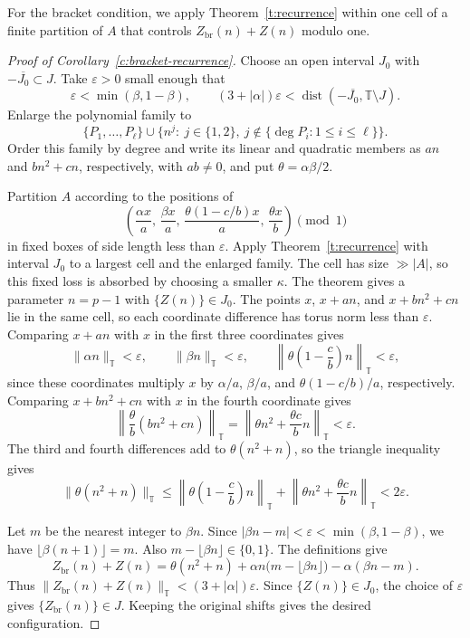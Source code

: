 \documentclass[12pt]{amsart}
\newcommand{\1}{\mathbf 1}
\theoremstyle{definition}
\begin{document}
For the bracket condition, we apply Theorem~\ref{t:recurrence}
within one cell of a finite partition of $A$ that controls
$Z_{\mathrm{br}}(n)+Z(n)$ modulo one.

\begin{proof}[Proof of Corollary~\ref{c:bracket-recurrence}]
Choose an open interval $J_0$ with $-\overline{J_0}\subset J$.
Take $\varepsilon>0$ small enough that
\[
 \varepsilon<\min(\beta,1-\beta),\qquad
 (3+|\alpha|)\varepsilon
 <\operatorname{dist}(-\overline{J_0},\mathbb T\setminus J).
\]
Enlarge the polynomial family to
\[
 \{P_1,\ldots,P_\ell\}
 \cup
 \bigl\{n^j:\ j\in\{1,2\},\
       j\notin\{\deg P_i:1\le i\le\ell\}\bigr\}.
\]
Order this family by degree and write its linear and quadratic
members as $an$ and $bn^2+cn$, respectively, with $ab\ne0$, and put $\theta=\alpha\beta/2$.

Partition $A$ according to the positions of
\[
 \left(
 \frac{\alpha x}{a},\,
 \frac{\beta x}{a},\,
 \frac{\theta(1-c/b)x}{a},\,
 \frac{\theta x}{b}
 \right)\pmod 1
\]
in fixed boxes of side length less than $\varepsilon$. Apply
Theorem~\ref{t:recurrence} with interval $J_0$ to a largest cell
and the enlarged family. The cell has size $\gg |A|$, so this
fixed loss is absorbed by choosing a smaller $\kappa$. The theorem
gives a parameter $n=p-1$ with $\{Z(n)\}\in J_0$. The points $x$, $x+an$, and $x+bn^2+cn$ lie in the same cell,
so each coordinate difference has torus norm less than
$\varepsilon$. Comparing $x+an$ with $x$ in the first three
coordinates gives
\[
 \|\alpha n\|_{\mathbb T}<\varepsilon,\qquad
 \|\beta n\|_{\mathbb T}<\varepsilon,\qquad
 \left\|\theta\left(1-\frac cb\right)n\right\|_{\mathbb T}
 <\varepsilon,
\]
since these coordinates multiply $x$ by $\alpha/a$, $\beta/a$,
and $\theta(1-c/b)/a$, respectively. Comparing $x+bn^2+cn$
with $x$ in the fourth coordinate gives
\[
 \left\|\frac{\theta}{b}(bn^2+cn)\right\|_{\mathbb T}
 =\left\|\theta n^2+\frac{\theta c}{b}n\right\|_{\mathbb T}
 <\varepsilon.
\]
The third and fourth differences add to $\theta(n^2+n)$, so
the triangle inequality gives
\[
 \|\theta(n^2+n)\|_{\mathbb T}
 \leq
 \left\|\theta\left(1-\frac cb\right)n\right\|_{\mathbb T}
 +\left\|\theta n^2+\frac{\theta c}{b}n\right\|_{\mathbb T}
 <2\varepsilon.
\]

Let $m$ be the nearest integer to $\beta n$. Since
$|\beta n-m|<\varepsilon<\min(\beta,1-\beta)$, we have
$\lfloor\beta(n+1)\rfloor=m$. Also
$m-\lfloor\beta n\rfloor\in\{0,1\}$. The definitions give
\[
 Z_{\mathrm{br}}(n)+Z(n)
 =\theta(n^2+n)
   +\alpha n\bigl(m-\lfloor\beta n\rfloor\bigr)
   -\alpha(\beta n-m).
\]
Thus $\|Z_{\mathrm{br}}(n)+Z(n)\|_{\mathbb T}
<(3+|\alpha|)\varepsilon$. Since $\{Z(n)\}\in J_0$, the choice
of $\varepsilon$ gives $\{Z_{\mathrm{br}}(n)\}\in J$.
Keeping the original shifts gives the desired configuration.
\end{proof}
\end{document}

